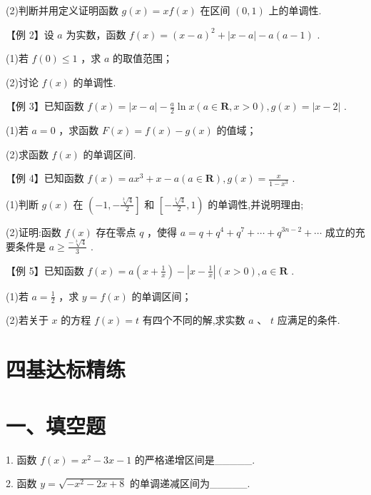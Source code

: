 (2)判断并用定义证明函数 $g\left( x\right)  = {xf}\left( x\right)$ 在区间 $\left( {0,1}\right)$ 上的单调性.

【例 2】设 $a$ 为实数，函数 $f\left( x\right)  = {\left( x - a\right) }^{2} + \left| {x - a}\right|  - a\left( {a - 1}\right)$ .

(1)若 $f\left( 0\right)  \leq  1$ ，求 $a$ 的取值范围；

(2)讨论 $f\left( x\right)$ 的单调性.

【例 3】已知函数 $f\left( x\right)  = \left| {x - a}\right|  - \frac{a}{2}\ln x\left( {a \in  \mathbf{R},x > 0}\right) ,g\left( x\right)  = \left| {x - 2}\right|$ .

(1)若 $a = 0$ ，求函数 $F\left( x\right)  = f\left( x\right)  - g\left( x\right)$ 的值域；

(2)求函数 $f\left( x\right)$ 的单调区间.

【例 4】已知函数 $f\left( x\right)  = a{x}^{3} + x - a\left( {a \in  \mathbf{R}}\right) ,g\left( x\right)  = \frac{x}{1 - {x}^{3}}$ .

(1)判断 $g\left( x\right)$ 在 $\left( {-1, - \frac{\sqrt[3]{4}}{2}}\right\rbrack$ 和 $\left\lbrack  {-\frac{\sqrt[3]{4}}{2},1}\right)$ 的单调性,并说明理由;

(2)证明:函数 $f\left( x\right)$ 存在零点 $q$ ，使得 $a = q + {q}^{4} + {q}^{7} + \cdots  + {q}^{{3n} - 2} + \cdots$ 成立的充要条件是 $a \geq  \frac{-\sqrt[3]{4}}{3}$ .

【例 5】已知函数 $f\left( x\right)  = a\left( {x + \frac{1}{x}}\right)  - \left| {x - \frac{1}{x}}\right| \left( {x > 0}\right) ,a \in  \mathbf{R}$ .

(1)若 $a = \frac{1}{2}$ ，求 $y = f\left( x\right)$ 的单调区间；

(2)若关于 $x$ 的方程 $f\left( x\right)  = t$ 有四个不同的解,求实数 $a\text{ 、 }t$ 应满足的条件.

\section*{四基达标精练}

\section*{一、填空题}

1. 函数 $f\left( x\right)  = {x}^{2} - {3x} - 1$ 的严格递增区间是\_\_\_\_\_.

2. 函数 $y = \sqrt{-{x}^{2} - {2x} + 8}$ 的单调递减区间为\_\_\_\_\_.

